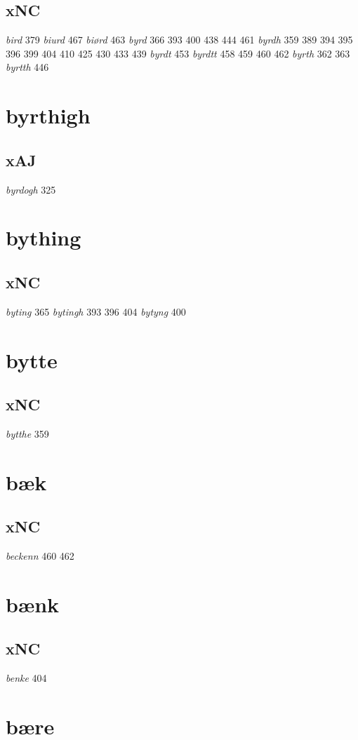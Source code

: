 \documentclass[a4paper,twocolumn]{article}
\begin{document}
\subsection{xNC}
\label{sec:orgb9b6d4a}
\emph{bird} 379 \emph{biurd} 467 \emph{biørd} 463 \emph{byrd} 366 393 400 438 444 461 \emph{byrdh} 359 389 394 395 396 399 404 410 425 430 433 439 \emph{byrdt} 453 \emph{byrdtt} 458 459 460 462 \emph{byrth} 362 363 \emph{byrtth} 446 
\section{byrthigh}
\label{sec:orgc087a17}
\subsection{xAJ}
\label{sec:org3b5e9db}
\emph{byrdogh} 325 
\section{bything}
\label{sec:orge012ad8}
\subsection{xNC}
\label{sec:org0bdb6fb}
\emph{byting} 365 \emph{bytingh} 393 396 404 \emph{bytyng} 400 
\section{bytte}
\label{sec:orge82e1c2}
\subsection{xNC}
\label{sec:org7467f7d}
\emph{bytthe} 359 
\section{bæk}
\label{sec:orgbff53a1}
\subsection{xNC}
\label{sec:org23f419c}
\emph{beckenn} 460 462 
\section{bænk}
\label{sec:orgf3bec39}
\subsection{xNC}
\label{sec:org6753c6e}
\emph{benke} 404 
\section{bære}
\label{sec:orgf0198cd}
\end{document}

